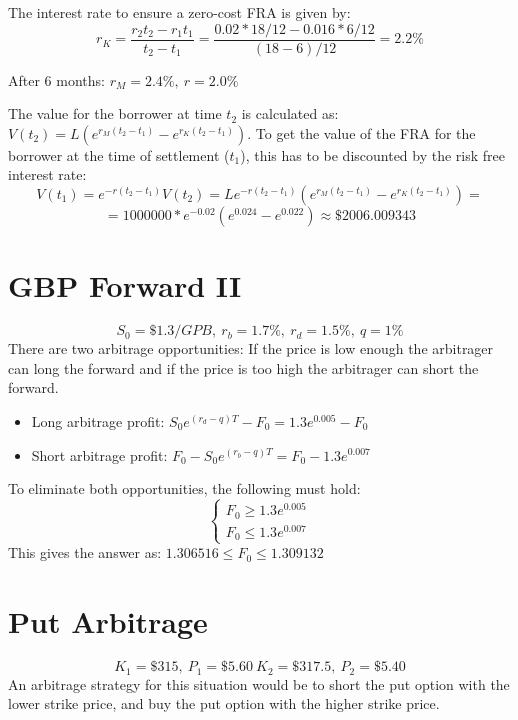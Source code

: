 \documentclass{article}
\begin{document}
The interest rate to ensure a zero-cost FRA is given by:
$$r_K = \frac{r_2t_2 - r_1t_1}{t_2-t_1} = \frac{0.02 * 18/12 - 0.016*6/12}{(18-6)/12} = 2.2\%$$

After 6 months: $r_M = 2.4\%, \ r=2.0\%$

The value for the borrower at time $t_2$ is calculated as: $ V(t_2) = L\left( e^{r_M(t_2-t_1)} - e^{r_K(t_2-t_1)} \right)$. To get the value of the FRA for the borrower at the time of settlement ($t_1$), this has to be discounted by the risk free interest rate:
$$V(t_1) = e^{-r(t_2-t_1)}V(t_2) = Le^{-r(t_2-t_1)}\left( e^{r_M(t_2-t_1)} - e^{r_K(t_2-t_1)} \right) = $$
$$ = 1000000 * e^{-0.02} \left( e^{0.024} - e^{0.022} \right) \approx \$2006.009343$$

\section{GBP Forward II}
$$S_0 = \$1.3/GPB, \ r_b = 1.7\%, \ r_d = 1.5\%, \ q=1\%$$
There are two arbitrage opportunities: If the price is low enough the arbitrager can long the forward and if the price is too high the arbitrager can short the forward.
\begin{itemize}
	\item Long arbitrage profit: $S_0e^{(r_d-q)T} - F_0= 1.3e^{0.005} - F_0$
	\item Short arbitrage profit: $F_0 - S_0e^{(r_b-q)T} = F_0 - 1.3e^{0.007}$
\end{itemize}

To eliminate both opportunities, the following must hold: 
$$\begin{cases} F_0 \geq 1.3e^{0.005} \\ F_0 \leq 1.3e^{0.007} \end{cases}$$
This gives the answer as: $1.306516 \leq F_0 \leq 1.309132$


\section{Put Arbitrage}
$$K_1 = \$315, \ P_1 = \$5.60 \ K_2 = \$317.5, \ P_2 = \$5.40$$
An arbitrage strategy for this situation would be to short the put option with the lower strike price, and buy the put option with the higher strike price.
\end{document}
